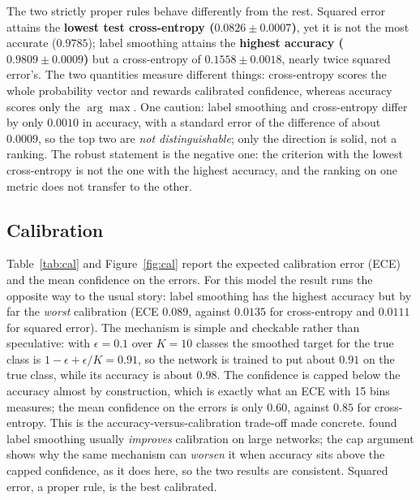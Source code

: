 \documentclass[11pt]{article}
\begin{document}
The two strictly proper rules behave differently from the rest. Squared error attains the
\textbf{lowest test cross-entropy ($0.0826 \pm 0.0007$)}, yet it is not the most accurate
($0.9785$); label smoothing attains the \textbf{highest accuracy ($0.9809 \pm 0.0009$)} but a
cross-entropy of $0.1558 \pm 0.0018$, nearly twice squared error's. The two quantities measure
different things: cross-entropy scores the whole probability vector and rewards calibrated
confidence, whereas accuracy scores only the $\arg\max$. One caution: label smoothing and
cross-entropy differ by only $0.0010$ in accuracy, with a standard error of the difference of
about $0.0009$, so the top two are \emph{not distinguishable}; only the direction is solid, not
a ranking. The robust statement is the negative one: the criterion with the lowest cross-entropy
is not the one with the highest accuracy, and the ranking on one metric does not transfer to the
other.

\subsection{Calibration}
\label{sec:cal}

Table~\ref{tab:cal} and Figure~\ref{fig:cal} report the expected calibration error (ECE) and
the mean confidence on the errors. For this model the result runs the opposite way to the usual
story: label smoothing has the highest accuracy but by far the \emph{worst} calibration
(ECE $0.089$, against $0.0135$ for cross-entropy and $0.0111$ for squared error). The mechanism
is simple and checkable rather than speculative: with $\epsilon=0.1$ over $K=10$ classes the
smoothed target for the true class is $1-\epsilon+\epsilon/K=0.91$, so the network is trained to
put about $0.91$ on the true class, while its accuracy is about $0.98$. The confidence is capped
below the accuracy almost by construction, which is exactly what an ECE with 15 bins measures;
the mean confidence on the errors is only $0.60$, against $0.85$ for cross-entropy. This is the
accuracy-versus-calibration trade-off made concrete. \textcite{muller2019} found
label smoothing usually \emph{improves} calibration on large networks; the cap argument shows why
the same mechanism can \emph{worsen} it when accuracy sits above the capped confidence, as it
does here, so the two results are consistent. Squared error, a proper rule, is the best
calibrated.
\end{document}
